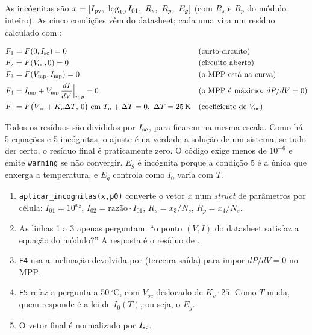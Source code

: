 As inc\'ognitas s\~ao $x=[\Ipv,\ \log_{10}I_{01},\ R_s,\ R_p,\ E_g]$ (com $R_s$ e $R_p$ do
m\'odulo inteiro). As cinco condi\c{c}\~oes v\^em do datasheet; cada uma vira um res\'iduo
calculado com :

\begin{align}
F_1&=F(0,\Isc)=0 &&\text{(curto-circuito)}\\
F_2&=F(\Voc,0)=0 &&\text{(circuito aberto)}\\
F_3&=F(\Vmp,\Imp)=0 &&\text{(o MPP est\'a na curva)}\\
F_4&=\Imp+\Vmp\,\dfrac{dI}{dV}\Big|_{mp}=0 &&\text{(o MPP \'e m\'aximo: } dP/dV=0)\\
F_5&=F\big(\Voc+K_v\Delta T,\,0\big)\ \text{em } T_n+\Delta T=0,\ \Delta T=25\,\text{K} &&\text{(coeficiente de }V_{oc}\text{)}
\end{align}

Todos os res\'iduos s\~ao divididos por $I_{\mathrm{sc}}$, para ficarem na mesma escala. Como h\'a 5
equa\c{c}\~oes e 5 inc\'ognitas, o ajuste \'e na verdade a solu\c{c}\~ao de um sistema; se tudo
der certo, o res\'iduo final \'e praticamente zero. O c\'odigo exige menos de $10^{-6}$ e emite
\texttt{warning} se n\~ao convergir. $E_g$ \'e inc\'ognita porque a condi\c{c}\~ao 5 \'e a \'unica
que enxerga a temperatura, e $E_g$ controla como $I_0$ varia com $T$.


\begin{logica}
\begin{enumerate}
\item \texttt{aplicar\_incognitas(x,p0)} converte o vetor $x$ num \emph{struct} de par\^ametros
 por c\'elula: $I_{01}=10^{x_2}$, $I_{02}=\text{raz\~ao}\cdot I_{01}$, $R_s=x_3/N_s$, $R_p=x_4/N_s$.
\item As linhas 1 a 3 apenas perguntam: ``o ponto $(V,I)$ do datasheet satisfaz a equa\c{c}\~ao do
 m\'odulo?'' A resposta \'e o res\'iduo de .
\item \texttt{F4} usa a inclina\c{c}\~ao devolvida por  (terceira sa\'ida) para
 impor $dP/dV=0$ no MPP.
\item \texttt{F5} refaz a pergunta a 50\,$^\circ$C, com $V_{oc}$ deslocado de $K_v\cdot25$. Como
 $T$ muda, quem responde \'e a lei de $I_0(T)$, ou seja, o $E_g$.
\item O vetor final \'e normalizado por $I_{\mathrm{sc}}$.
\end{enumerate}
\end{logica}

